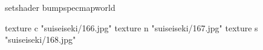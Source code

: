 setshader bumpspecmapworld

    texture c "suiseiseki/166.jpg"
    texture n "suiseiseki/167.jpg"
    texture s "suiseiseki/168.jpg"
